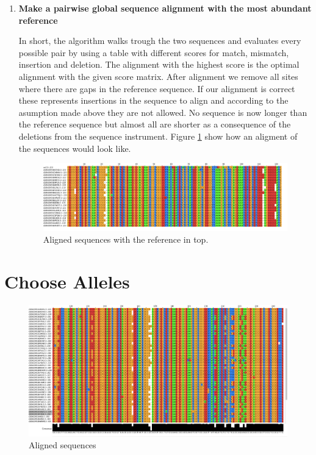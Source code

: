 \documentclass[a4paper,11pt]{kth-mag}
\begin{document}
\begin{enumerate}
	\item \textbf{Make a pairwise global sequence alignment with the most abundant reference}

In short, the algorithm walks trough the two sequences and evaluates every possible pair by using a table with different scores for match, mismatch, insertion and deletion. The alignment with the highest score is the optimal alignment with the given score matrix. After alignment we remove all sites where there are gaps in the reference sequence. If our alignment is correct these represents insertions in the sequence to align and according to the asumption made above they are not allowed. No sequence is now longer than the reference sequence but almost all are shorter as a consequence of the deletions from the sequence instrument. Figure \ref{fig:aligned_sequences} show how an aligment of the sequences would look like.

\begin{figure}[ht]
	\centering
		\includegraphics[width=\textwidth]{../pictures/align_with_ref_cropped.png}
	\caption{Aligned sequences with the reference in top.}
	\label{fig:aligned_sequences}
\end{figure}

\end{enumerate}



\section{Choose Alleles}

\begin{figure}[ht]
	\centering
		\includegraphics[width=\textwidth]{../pictures/align_example.png}
	\caption{Aligned sequences}
	\label{fig:many_aligned_sequences}
\end{figure}
\end{document}
